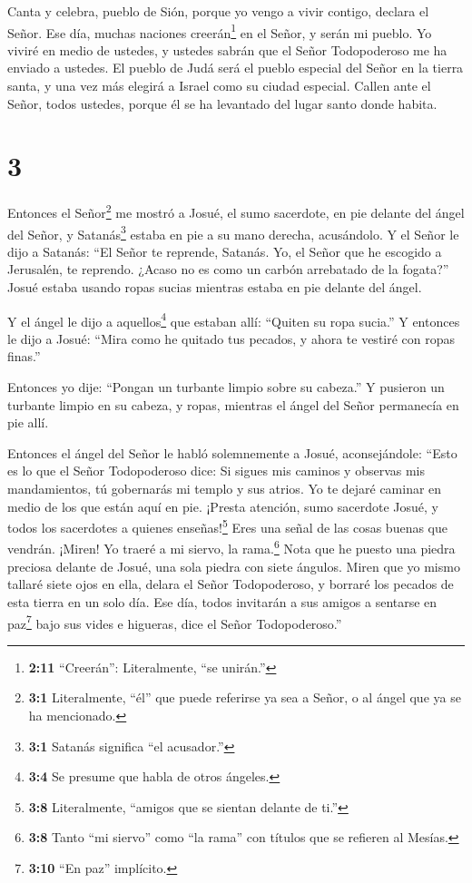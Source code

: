  Canta y celebra, pueblo de Sión, porque yo vengo a vivir
contigo, declara el Señor.  Ese día, muchas naciones
creerán\footnote{\textbf{2:11} ``Creerán'': Literalmente, ``se unirán.''}
en el Señor, y serán mi pueblo. Yo viviré en medio de ustedes, y ustedes
sabrán que el Señor Todopoderoso me ha enviado a ustedes. 
El pueblo de Judá será el pueblo especial del Señor en la tierra santa,
y una vez más elegirá a Israel como su ciudad especial. 
Callen ante el Señor, todos ustedes, porque él se ha levantado del lugar
santo donde habita.

\hypertarget{section-2}{%
\section{3}\label{section-2}}

 Entonces el Señor\footnote{\textbf{3:1} Literalmente,
  ``él'' que puede referirse ya sea a Señor, o al ángel que ya se ha
  mencionado.} me mostró a Josué, el sumo sacerdote, en pie delante del
ángel del Señor, y Satanás\footnote{\textbf{3:1} Satanás significa ``el
  acusador.''} estaba en pie a su mano derecha, acusándolo. 
Y el Señor le dijo a Satanás: ``El Señor te reprende, Satanás. Yo, el
Señor que he escogido a Jerusalén, te reprendo. ¿Acaso no es como un
carbón arrebatado de la fogata?''  Josué estaba usando ropas
sucias mientras estaba en pie delante del ángel.

 Y el ángel le dijo a aquellos\footnote{\textbf{3:4} Se
  presume que habla de otros ángeles.} que estaban allí: ``Quiten su
ropa sucia.'' Y entonces le dijo a Josué: ``Mira como he quitado tus
pecados, y ahora te vestiré con ropas finas.''

 Entonces yo dije: ``Pongan un turbante limpio sobre su
cabeza.'' Y pusieron un turbante limpio en su cabeza, y ropas, mientras
el ángel del Señor permanecía en pie allí.

 Entonces el ángel del Señor le habló solemnemente a Josué,
aconsejándole:  ``Esto es lo que el Señor Todopoderoso dice:
Si sigues mis caminos y observas mis mandamientos, tú gobernarás mi
templo y sus atrios. Yo te dejaré caminar en medio de los que están aquí
en pie.  ¡Presta atención, sumo sacerdote Josué, y todos los
sacerdotes a quienes enseñas!\footnote{\textbf{3:8} Literalmente,
  ``amigos que se sientan delante de ti.''} Eres una señal de las cosas
buenas que vendrán. ¡Miren! Yo traeré a mi siervo, la rama.\footnote{\textbf{3:8}
  Tanto ``mi siervo'' como ``la rama'' con títulos que se refieren al
  Mesías.}  Nota que he puesto una piedra preciosa delante
de Josué, una sola piedra con siete ángulos. Miren que yo mismo tallaré
siete ojos en ella, delara el Señor Todopoderoso, y borraré los pecados
de esta tierra en un solo día.  Ese día, todos invitarán a
sus amigos a sentarse en paz\footnote{\textbf{3:10} ``En paz''
  implícito.} bajo sus vides e higueras, dice el Señor Todopoderoso.''


